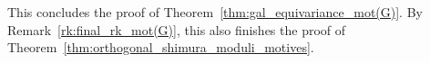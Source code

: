 \begin{remark}
This concludes the proof of Theorem~\ref{thm:gal_equivariance_mot(G)}. By Remark~\ref{rk:final_rk_mot(G)}, this also finishes the proof of Theorem~\ref{thm:orthogonal_shimura_moduli_motives}.
\end{remark}
%
